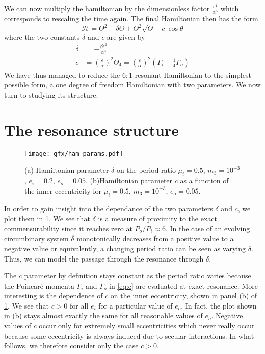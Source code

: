 We can now multiply the hamiltonian by the dimensionless factor 
$\frac{\epsilon^4}{\alpha^5}$ which corresponds to rescaling the time
again. The final Hamiltonian then has the form
\begin{equation}
    \mathcal{H}= \Theta^2-\delta\Theta +
     \Theta^2\sqrt{\Theta+ c}
    \cos\theta
    \label{eq:hamiltonian_final}
\end{equation}
where the two constants $\delta$ and $c$ are given by
\begin{align}
    \delta&= -\frac{\beta\epsilon^2}{\alpha^3}\label{eq:delta}\\
    c&= \left( \frac{\epsilon}{\alpha} \right)^2 \Theta_4
    =\left( \frac{\epsilon}{\alpha} \right)^2\left(\Gamma_i- \frac{1}{4}
    \Gamma_o\right)\label{eq:c}
\end{align}
We have thus managed to reduce the $6:1$ resonant Hamiltonian to the
simplest possible form, a one degree of freedom Hamiltonian with two
parameters. We now turn to studying its structure.
\section{The resonance structure}
\label{sec:The resonance structure}
\begin{figure}[htb]
\centering
    \texttt{[image: gfx/ham\_params.pdf]}
    \caption{(a) Hamiltonian parameter $\delta$
     on the period ratio $\mu_i=0.5$, $m_3=10^{-3}$, $e_i=0.2$, $e_o=0.05$.
     (b)Hamiltonian parameter $c$ as a function of the inner
     eccentricity for $\mu_i=0.5$, $m_3=10^{-3}$, $e_o=0.05$.}
\label{fig:ham_params}
\end{figure}
In order to gain insight into the dependance of the two parameters $\delta$
and $c$, we plot them in \cref{fig:ham_params}. We see that $\delta$ is a 
measure of proximity to the exact commensurability since it reaches 
zero at $P_o/P_i\approx 6$. In the case of an evolving circumbinary 
system $\delta$ monotonically decreases from a positive value to a negative
value or equivalently, a changing period ratio can be seen as varying
$\delta$. Thus, we can model the passage through the resonance through 
$\delta$.  

The $c$ parameter by definition stays constant as the period ratio varies
because the Poincaré momenta $\Gamma_i$ and $\Gamma_o$ in \cref{eq:c}
are evaluated at exact resonance. More interesting is the dependence
of $c$ on the inner eccentricity, shown in panel (b) of \cref{fig:ham_params}.
We see that $c>0$ for all $e_i$ for a particular value of $e_o$. In fact, the
plot shown in (b) stays almost exactly the same for all reasonable values
of $e_o$. Negative values of $c$ occur only for extremely small eccentricities
which never really occur because some eccentricity is always induced due to 
secular interactions. In what follows, we therefore consider only the case
$c>0$.

